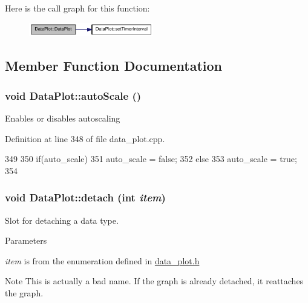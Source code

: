Here is the call graph for this function:\nopagebreak
\begin{figure}[H]
\begin{center}
\leavevmode
\includegraphics[width=154pt]{classDataPlot_a1343acbd6095212532c4315d6e9f1711_cgraph}
\end{center}
\end{figure}




\subsection{Member Function Documentation}
\hypertarget{classDataPlot_a6409fa9685624b4a453529254e6d943f}{
\subsubsection[{autoScale}]{\setlength{\rightskip}{0pt plus 5cm}void DataPlot::autoScale ()}}
\label{classDataPlot_a6409fa9685624b4a453529254e6d943f}
Enables or disables autoscaling 

Definition at line 348 of file data\_\-plot.cpp.




\begin{DoxyCode}
349 {
350     if(auto_scale)
351         auto_scale = false;
352     else
353         auto_scale = true;
354 }
\end{DoxyCode}


\hypertarget{classDataPlot_a5521e1760646dbcf90df949e20523803}{
\subsubsection[{detach}]{\setlength{\rightskip}{0pt plus 5cm}void DataPlot::detach (int {\em item})}}
\label{classDataPlot_a5521e1760646dbcf90df949e20523803}
Slot for detaching a data type. 
\begin{DoxyParams}{Parameters}
\item[{\em item}]is from the enumeration defined in \hyperlink{data__plot_8h}{data\_\-plot.h} \end{DoxyParams}
\begin{DoxyNote}{Note}
This is actually a bad name. If the graph is already detached, it reattaches the graph. 
\end{DoxyNote}


